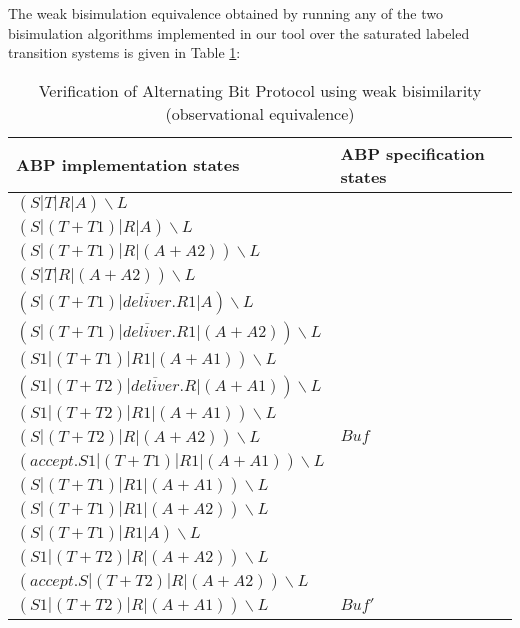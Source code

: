 The weak bisimulation equivalence obtained by running any of the two bisimulation algorithms implemented in our tool over the saturated labeled transition systems is given in Table \ref{table3}:

\begin{table}
\begin{tabular}{| p{6.5cm} | p{3.5cm} | }
	
  \hline                       
	ABP implementation states &
	ABP specification states
	\\ \hline
	
$\left(S|T|R|A\right)\backslash L$ & \\
$\left(S|\left(T+T1\right)|R|A\right)\backslash L$ & \\
$\left(S|\left(T+T1\right)|R|\left(A+A2\right)\right)\backslash L$ & \\
$\left(S|T|R|\left(A+A2\right)\right)\backslash L$ & \\
$\left(S|\left(T+T1\right)|\overline{deliver}.R1|A\right)\backslash L$ & \\
$\left(S|\left(T+T1\right)|\overline{deliver}.R1|\left(A+A2\right)\right)\backslash L$ & \\
$\left(S1|\left(T+T1\right)|R1|\left(A+A1\right)\right)\backslash L$ & \\
$\left(S1|\left(T+T2\right)|\overline{deliver}.R|\left(A+A1\right)\right)\backslash L$ & \\
$\left(S1|\left(T+T2\right)|R1|\left(A+A1\right)\right)\backslash L$ & \\
$\left(S|\left(T+T2\right)|R|\left(A+A2\right)\right)\backslash L$ &
  $\mathit{Buf}$   
  \\ \hline
   
$\left(accept.S1|\left(T+T1\right)|R1|\left(A+A1\right)\right)\backslash L$ & \\ 
$\left(S|\left(T+T1\right)|R1|\left(A+A1\right)\right)\backslash L$ & \\
$\left(S|\left(T+T1\right)|R1|\left(A+A2\right)\right)\backslash L$ & \\
$\left(S|\left(T+T1\right)|R1|A\right)\backslash L$ & \\
$\left(S1|\left(T+T2\right)|R|\left(A+A2\right)\right)\backslash L$ & \\
$\left(accept.S|\left(T+T2\right)|R|\left(A+A2\right)\right)\backslash L$ & \\
$\left(S1|\left(T+T2\right)|R|\left(A+A1\right)\right)\backslash L$ &
  $\mathit{Buf'}$
  \\ \hline  
\end{tabular}
\\
\caption{Verification of Alternating Bit Protocol using weak bisimilarity (observational equivalence)}
\label{table3}
\end{table}
